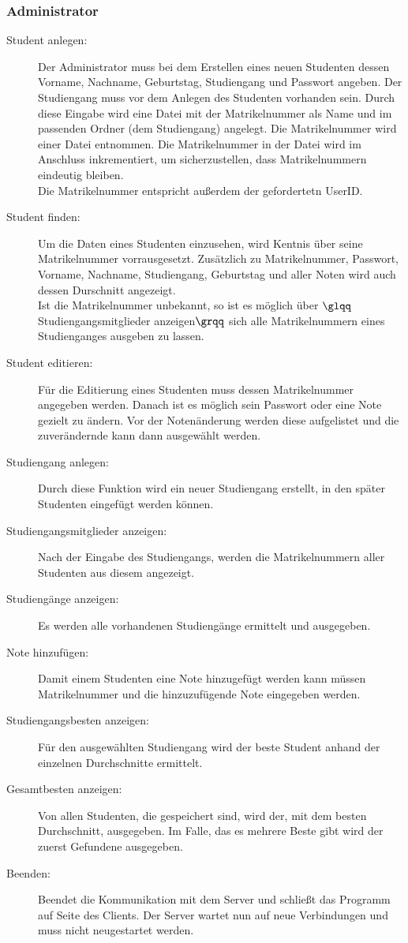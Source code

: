 \documentclass{scrartcl}
\begin{document}
		\subsubsection{Administrator}
			\begin{description}
				\item[Student anlegen:] Der Administrator muss bei dem Erstellen eines neuen Studenten dessen Vorname, Nachname, Geburtstag, Studiengang und Passwort angeben. Der Studiengang muss vor dem Anlegen des Studenten vorhanden sein. Durch diese Eingabe wird eine Datei mit der Matrikelnummer als Name und im passenden Ordner (dem Studiengang) angelegt. Die Matrikelnummer wird einer Datei entnommen. Die Matrikelnummer in der Datei wird im Anschluss inkrementiert, um sicherzustellen, dass Matrikelnummern eindeutig bleiben. \\
				Die Matrikelnummer entspricht außerdem der gefordertetn UserID.
				\item[Student finden:] Um die Daten eines Studenten einzusehen, wird Kentnis über seine Matrikelnummer vorrausgesetzt. Zusätzlich zu Matrikelnummer, Passwort, Vorname, Nachname, Studiengang, Geburtstag und aller Noten wird auch dessen Durschnitt angezeigt. \\
				Ist die Matrikelnummer unbekannt, so ist es möglich über $\glqq$Studiengangsmitglieder anzeigen$\grqq$ sich alle Matrikelnummern eines Studienganges ausgeben zu lassen.
				\item[Student editieren:] Für die Editierung eines Studenten muss dessen Matrikelnummer angegeben werden. Danach ist es möglich sein Passwort oder eine Note gezielt zu ändern. Vor der Notenänderung werden diese aufgelistet und die zuverändernde kann dann ausgewählt werden.
				\item[Studiengang anlegen:] Durch diese Funktion wird ein neuer Studiengang erstellt, in den später Studenten eingefügt werden können.
				\item[Studiengangsmitglieder anzeigen:] Nach der Eingabe des Studiengangs, werden die Matrikelnummern aller Studenten aus diesem angezeigt.
				\item[Studiengänge anzeigen:] Es werden alle vorhandenen Studiengänge ermittelt und ausgegeben.
				\item[Note hinzufügen:] Damit einem Studenten eine Note hinzugefügt werden kann müssen Matrikelnummer und die hinzuzufügende Note eingegeben werden.
				\item[Studiengangsbesten anzeigen:] Für den ausgewählten Studiengang wird der beste Student anhand der einzelnen Durchschnitte ermittelt.
				\item[Gesamtbesten anzeigen:] Von allen Studenten, die gespeichert sind, wird der, mit dem besten Durchschnitt, ausgegeben. Im Falle, das es mehrere Beste gibt wird der zuerst Gefundene ausgegeben.
				\item[Beenden:] Beendet die Kommunikation mit dem Server und schließt das Programm auf Seite des Clients. Der Server wartet nun auf neue Verbindungen und muss nicht neugestartet werden.
			\end{description}
\end{document}
